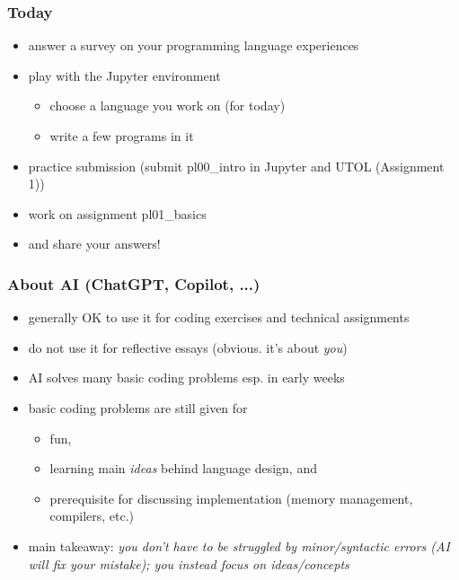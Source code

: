 \documentclass[12pt,dvipdfmx]{beamer}
\newcommand{\mura}[1]{{\color{purple}#1}}
\newcommand{\ao}[1]{{\color{blue}#1}}
\begin{document}
\begin{frame}
  \frametitle{Today}
  \begin{itemize}
  \item answer a survey on your programming language experiences
  \item play with the Jupyter environment
    \begin{itemize}
    \item choose a language you work on (for today)
    \item write a few programs in it
    \end{itemize}
  \item practice submission (submit \ao{pl00\_intro} in Jupyter and UTOL (Assignment 1))
  \item work on assignment \ao{pl01\_basics}
  \item and share your answers!
  \end{itemize}
\end{frame}

\begin{frame}
  \frametitle{About AI (ChatGPT, Copilot, ...)}
  \begin{itemize}
  \item generally \ao{OK to use it for coding exercises and technical assignments}
  \item do \mura{not} use it for reflective essays (obvious. it's about {\it you})
  \item AI solves many basic coding problems esp. in early weeks
  \item basic coding problems are still given for
    \begin{itemize}
    \item fun,
    \item learning main \ao{\it ideas} behind language design, and
    \item prerequisite for discussing implementation
      (memory management, compilers, etc.)
    \end{itemize}
  \item main takeaway:
    \ao{\it you don't have to be struggled by minor/syntactic errors
      (AI will fix your mistake); you instead focus on ideas/concepts}
  \end{itemize}
\end{frame}
\end{document}
